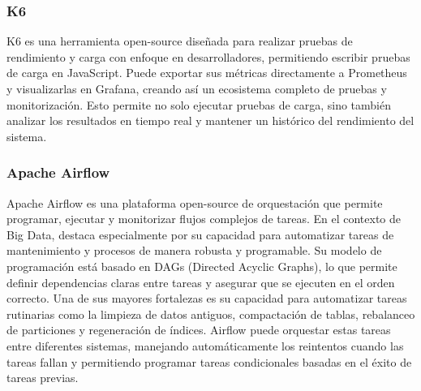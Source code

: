 \subsubsection{K6}
K6 es una herramienta open-source diseñada para realizar pruebas de rendimiento y carga con enfoque en desarrolladores, permitiendo escribir pruebas de carga en JavaScript.
Puede exportar sus métricas directamente a Prometheus y visualizarlas en Grafana, creando así un ecosistema completo de pruebas y monitorización. 
Esto permite no solo ejecutar pruebas de carga, sino también analizar los resultados en tiempo real y mantener un histórico del rendimiento del sistema. 

\subsubsection{Apache Airflow}

Apache Airflow es una plataforma open-source de orquestación que permite programar, ejecutar y monitorizar flujos complejos de tareas. 
En el contexto de Big Data, destaca especialmente por su capacidad para automatizar tareas de mantenimiento y procesos de manera robusta y programable. 
Su modelo de programación está basado en DAGs (Directed Acyclic Graphs), lo que permite definir dependencias claras entre tareas y asegurar que se ejecuten en el orden correcto.
Una de sus mayores fortalezas es su capacidad para automatizar tareas rutinarias como la limpieza de datos antiguos, compactación de tablas, rebalanceo de particiones y regeneración de índices. 
Airflow puede orquestar estas tareas entre diferentes sistemas, manejando automáticamente los reintentos cuando las tareas fallan 
y permitiendo programar tareas condicionales basadas en el éxito de tareas previas.